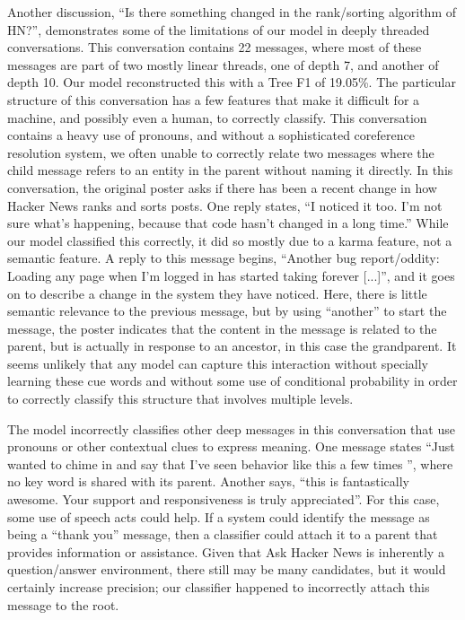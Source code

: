 \documentclass{article}
\begin{document}
Another discussion, ``Is there something changed in the rank/sorting algorithm 
of HN?'', demonstrates some of the limitations of our model in deeply threaded 
conversations. This conversation contains 22 messages, where most of these 
messages are part of two mostly linear threads, one of depth 7, and another of 
depth 10. Our model reconstructed this with a Tree F1 of 19.05\%. The 
particular structure of this conversation has a few features that make it 
difficult for a machine, and possibly even a human, to correctly classify. 
This conversation contains a heavy use of pronouns, and without a 
sophisticated coreference resolution system, we often unable to correctly 
relate two messages where the child message refers to an entity in the parent 
without naming it directly. In this conversation, the original poster asks if 
there has been a recent change in how Hacker News ranks and sorts posts. One 
reply states, ``I noticed it too. I'm not sure what's happening, because that 
code hasn't changed in a long time.'' While our model classified this 
correctly, it did so mostly due to a karma feature, not a semantic feature. A 
reply to this message begins, ``Another bug report/oddity: Loading any page 
when I'm logged in has started taking forever [...]'', and it goes on to 
describe a change in the system they have noticed. Here, there is little 
semantic relevance to the previous message, but by using ``another'' to start 
the message, the poster indicates that the content in the message is related 
to the parent, but is actually in response to an ancestor, in this case the 
grandparent. It seems unlikely that any model can capture this interaction 
without specially learning these cue words and without some use of conditional 
probability in order to correctly classify this structure that involves 
multiple levels.

The model incorrectly classifies other deep messages in this conversation that 
use pronouns or other contextual clues to express meaning. One message states 
``Just wanted to chime in and say that I've seen behavior like this a few times
'', where no key word is shared with its parent. Another says, ``this is 
fantastically awesome. Your support and responsiveness is truly appreciated''. 
For this case, some use of speech acts could help. If a system could identify 
the message as being a ``thank you'' message, then a classifier could attach 
it to a parent that provides information or assistance. Given that Ask Hacker 
News is inherently a question/answer environment, there still may be many 
candidates, but it would certainly increase precision; our classifier happened 
to incorrectly attach this message to the root.
\end{document}
